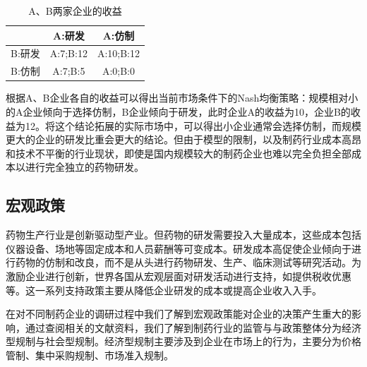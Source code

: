 \documentclass[twocolumn,openany]{ctexbook}
\begin{document}
			
			\begin{table}
				\centering
				\begin{tabular}{|c|c|c|}
					\hline
					\quad  & A:研发   & A:仿制    \\
					\hline
					B:研发 & A:7;B:12 & A:10;B:12 \\
					\hline
					B:仿制 & A:7;B:5  & A:0;B:0   \\
					\hline
				\end{tabular}
				\caption{A、B两家企业的收益}
				\label{tab:tab2}
			\end{table}
			
			根据A、B企业各自的收益可以得出当前市场条件下的Nash均衡策略：规模相对小的A企业倾向于选择仿制，B企业倾向于研发，此时企业A的收益为10，企业B的收益为12。将这个结论拓展的实际市场中，可以得出小企业通常会选择仿制，而规模更大的企业的研发比重会更大的结论。但由于模型的限制，以及制药行业成本高昂和技术不平衡的行业现状，即使是国内规模较大的制药企业也难以完全负担全部成本以进行完全独立的药物研发。
			
			\subsection{宏观政策}
			
			药物生产行业是创新驱动型产业。但药物的研发需要投入大量成本，这些成本包括仪器设备、场地等固定成本和人员薪酬等可变成本。研发成本高促使企业倾向于进行药物的仿制和改良，而不是从头进行药物研发、生产、临床测试等研究活动。为激励企业进行创新，世界各国从宏观层面对研发活动进行支持，如提供税收优惠等。这一系列支持政策主要从降低企业研发的成本或提高企业收入入手。
			
			在对不同制药企业的调研过程中我们了解到宏观政策能对企业的决策产生重大的影响，通过查阅相关的文献资料，我们了解到制药行业的监管与与政策整体分为经济型规制与社会型规制\citep{RN26}。经济型规制主要涉及到企业在市场上的行为，主要分为价格管制、集中采购规制、市场准入规制。
			
\end{document}
